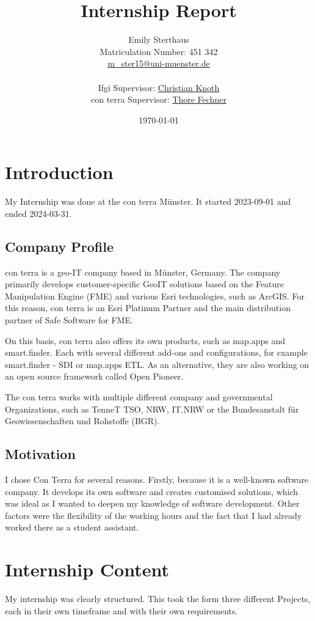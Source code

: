 \documentclass[11pt, titlepage, a4paper]{article}
\title{Internship Report}
\author{Emily Sterthaus \\ Matriculation Number: 451 342 \\ \href{mailto:m_ster15@uni-muenster.de}{m\_ster15@uni-muenster.de}\\ \\
\small Ifgi Supervisor: \href{mailto:christian.knoth@uni-muenster.de}{Christian Knoth}\\ \small con terra Supervisor: \href{mailto:t.fechner@conterra.de}{Thore Fechner}
}
\date{\today}
\begin{document}
\maketitle
\newpage
\tableofcontents
\newpage

\section{Introduction}

My Internship was done at the con terra Münster. It started 2023-09-01 and ended 2024-03-31.
\subsection{Company Profile}
con terra is a geo-IT company based in Münster, Germany. The company primarily develops customer-specific GeoIT solutions based on the Feature Manipulation Engine (FME) and various Esri technologies, such as ArcGIS. For this reason, con terra is an Esri Platinum Partner and the main distribution partner of Safe Software for FME.

On this basis, con terra also offers its own products, such as map.apps and smart.finder. Each with several different add-ons and configurations, for example smart.finder - SDI or map.apps ETL. As an alternative, they are also working on an open source framework called Open Pioneer.  %

The con terra works with multiple different company and governmental Organizations, such as TenneT TSO,   NRW, IT.NRW or the Bundesanstalt für Geowissenschaften und Rohstoffe  (BGR).

\subsection{Motivation}
I chose Con Terra for several reasons. Firstly, because it is a well-known software company. It develops its own software and creates customised solutions, which was ideal as I wanted to deepen my knowledge of software development. Other factors were the flexibility of the working hours and the fact that I had already worked there as a student assistant.

\section{Internship Content}

My internship was clearly structured. This took the form three different Projects, each in their own timeframe and with their own requirements.
\end{document}
